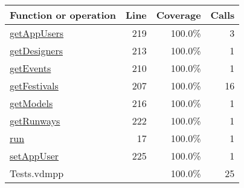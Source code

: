 \bigskip
\begin{longtable}{|l|r|r|r|}
\hline
Function or operation & Line & Coverage & Calls \\
\hline
\hline
\hyperref[getAppUsers:219]{getAppUsers} & 219&100.0\% & 3 \\
\hline
\hyperref[getDesigners:213]{getDesigners} & 213&100.0\% & 1 \\
\hline
\hyperref[getEvents:210]{getEvents} & 210&100.0\% & 1 \\
\hline
\hyperref[getFestivals:207]{getFestivals} & 207&100.0\% & 16 \\
\hline
\hyperref[getModels:216]{getModels} & 216&100.0\% & 1 \\
\hline
\hyperref[getRunways:222]{getRunways} & 222&100.0\% & 1 \\
\hline
\hyperref[run:17]{run} & 17&100.0\% & 1 \\
\hline
\hyperref[setAppUser:225]{setAppUser} & 225&100.0\% & 1 \\
\hline
\hline
Tests.vdmpp & & 100.0\% & 25 \\
\hline
\end{longtable}

